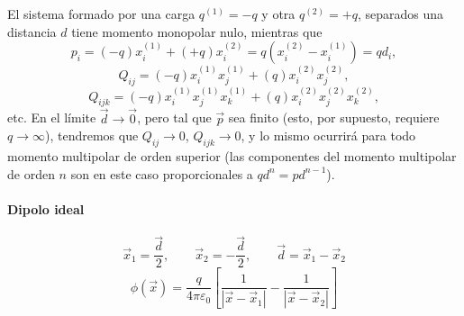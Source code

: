 El sistema formado por una carga $q^{(1)}=-q$ y otra $q^{(2)}=+q$, separados una distancia $d$ tiene momento monopolar nulo, mientras que 
\begin{equation}
p_i=(-q)x^{(1)}_i+(+q)x^{(2)}_i=q(x^{(2)}_i-x^{(1)}_i)=qd_i,
\end{equation}
\begin{equation}
Q_{ij}=(-q)x^{(1)}_i x^{(1)}_j +(q)x^{(2)}_i x^{(2)}_j,
\end{equation}
\begin{equation}
Q_{ijk}=(-q)x^{(1)}_i x^{(1)}_jx^{(1)}_k +(q)x^{(2)}_i x^{(2)}_jx^{(2)}_k,
\end{equation}
etc. En el límite $\vec{d}\to\vec{0}$, pero tal que $\vec{p}$ sea finito (esto, por supuesto, requiere $q\to\infty$), tendremos que $Q_{ij}\to 0$, $Q_{ijk}\to 0$, y lo mismo ocurrirá para todo momento multipolar de orden superior  (las componentes del momento multipolar de orden $n$ son en este caso proporcionales a $qd^n=pd^{n-1}$).

\paragraph{Dipolo ideal}
\begin{equation}
\vec{x}_1=\frac{\vec{d}}{2}, \qquad \vec{x}_2=-\frac{\vec{d}}{2}, \qquad
\vec{d}=\vec{x}_1-\vec{x}_2
\end{equation}
\begin{equation}
\phi(\vec{x})=\frac{q}{4 \pi \varepsilon_0}\left[\frac{1}{\left|\vec{x}-\vec{x}_1\right|}-\frac{1}{\left|\vec{x}-\vec{x}_2\right|}\right]
\end{equation}

